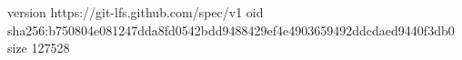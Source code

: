 version https://git-lfs.github.com/spec/v1
oid sha256:b750804e081247dda8fd0542bdd9488429ef4e4903659492ddcdaed9440f3db0
size 127528
